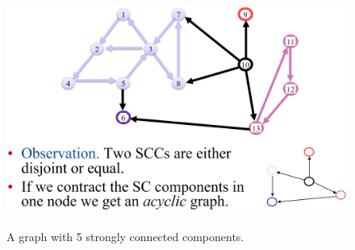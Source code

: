 \begin{figure}[h]
    \begin{center}
      \includegraphics[height=3in]{./Sections/graphs/dag/strong_conn.png}
    \end{center}
     \caption{A graph with 5 strongly connected components.}\label{fig:strong_conn}
\end{figure}